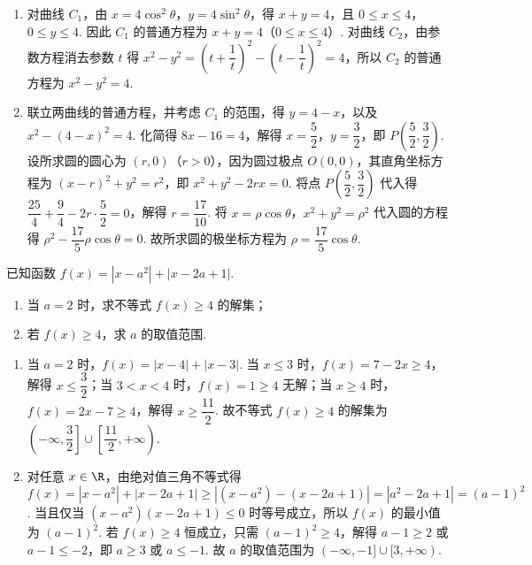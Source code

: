 \begin{solution}
\begin{enumerate}
\item 对曲线 \(C_1\)，由 \(x=4\cos^2\theta\)，\(y=4\sin^2\theta\)，得 \(x+y=4\)，且 \(0\le x\le4\)，\(0\le y\le4\). 因此 \(C_1\) 的普通方程为 \(x+y=4\)（\(0\le x\le4\)）. 对曲线 \(C_2\)，由参数方程消去参数 \(t\) 得 \(x^2-y^2=\left(t+\dfrac1t\right)^2-\left(t-\dfrac1t\right)^2=4\)，所以 \(C_2\) 的普通方程为 \(x^2-y^2=4\).
\item 联立两曲线的普通方程，并考虑 \(C_1\) 的范围，得 \(y=4-x\)，以及 \(x^2-(4-x)^2=4\). 化简得 \(8x-16=4\)，解得 \(x=\dfrac52\)，\(y=\dfrac32\)，即 \(P\left(\dfrac52,\dfrac32\right)\). 设所求圆的圆心为 \((r,0)\)（\(r>0\)），因为圆过极点 \(O(0,0)\)，其直角坐标方程为 \((x-r)^2+y^2=r^2\)，即 \(x^2+y^2-2rx=0\). 将点 \(P\left(\dfrac52,\dfrac32\right)\) 代入得 \(\dfrac{25}{4}+\dfrac94-2r\cdot\dfrac52=0\)，解得 \(r=\dfrac{17}{10}\). 将 \(x=\rho\cos\theta\)，\(x^2+y^2=\rho^2\) 代入圆的方程得 \(\rho^2-\dfrac{17}{5}\rho\cos\theta=0\). 故所求圆的极坐标方程为 \(\rho=\dfrac{17}{5}\cos\theta\).
\end{enumerate}
\end{solution}

\begin{problem}
已知函数 \(f(x)=|x-a^2|+|x-2a+1|\).

\begin{enumerate}
\item 当 \(a=2\) 时，求不等式 \(f(x)\geq 4\) 的解集；
\item 若 \(f(x)\geq 4\)，求 \(a\) 的取值范围.
\end{enumerate}
\end{problem}

\begin{solution}
\begin{enumerate}
\item 当 \(a=2\) 时，\(f(x)=|x-4|+|x-3|\). 当 \(x\le3\) 时，\(f(x)=7-2x\ge4\)，解得 \(x\le\dfrac32\)；当 \(3<x<4\) 时，\(f(x)=1\ge4\) 无解；当 \(x\ge4\) 时，\(f(x)=2x-7\ge4\)，解得 \(x\ge\dfrac{11}{2}\). 故不等式 \(f(x)\ge4\) 的解集为 \(\left(-\infty,\dfrac32\right]\cup\left[\dfrac{11}{2},+\infty\right)\).
\item 对任意 \(x\in\R\)，由绝对值三角不等式得 \(f(x)=|x-a^2|+|x-2a+1|\ge|(x-a^2)-(x-2a+1)|=|a^2-2a+1|=(a-1)^2\). 当且仅当 \((x-a^2)(x-2a+1)\le0\) 时等号成立，所以 \(f(x)\) 的最小值为 \((a-1)^2\). 若 \(f(x)\ge4\) 恒成立，只需 \((a-1)^2\ge4\)，解得 \(a-1\ge2\) 或 \(a-1\le-2\)，即 \(a\ge3\) 或 \(a\le-1\). 故 \(a\) 的取值范围为 \((-\infty,-1]\cup[3,+\infty)\).
\end{enumerate}
\end{solution}
